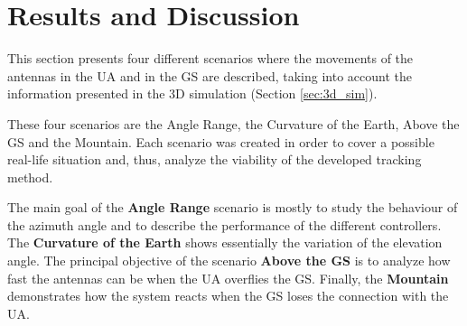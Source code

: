 \chapter{Results and Discussion}\label{ch:results}

This section presents four different scenarios where the movements of the antennas in the UA and in the GS are described, taking into account the information presented in the 3D simulation (Section \ref{sec:3d_sim}).

These four scenarios are the Angle Range, the Curvature of the Earth, Above the GS and the Mountain. Each scenario was created in order to cover a possible real-life situation and, thus, analyze the viability of the developed tracking method.

The main goal of the \textbf{Angle Range} scenario is mostly to study the behaviour of the azimuth angle and to describe the performance of the different controllers. The \textbf{Curvature of the Earth} shows essentially the variation of the elevation angle. The principal objective of the scenario \textbf{Above the GS} is to analyze how fast the antennas can be when the UA overflies the GS. Finally, the \textbf{Mountain} demonstrates how the system reacts when the GS loses the connection with the UA. 